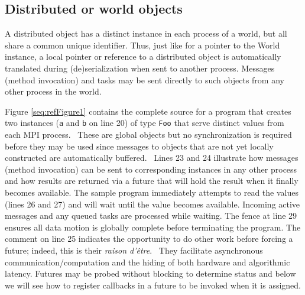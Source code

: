 \documentclass[letterpaper]{article}
\newcounter{Figure}
\begin{document}
\subsection{Distributed or world objects}
A distributed object has a distinct instance in each process of a world, but all share a common unique identifier. Thus,
just like for a pointer to the World instance, a local pointer or reference to a distributed object is automatically
translated during (de)serialization when sent to another process. Messages (method invocation) and tasks may be sent
directly to such objects from any other process in the world.

Figure \ref{seq:refFigure1} contains the complete source for a program that creates two instances (\texttt{a} and
\texttt{b} on line 20) of type \texttt{Foo} that serve distinct values from each MPI process. \ These are global
objects but no synchronization is required before they may be used since messages to objects that are not yet locally
constructed are automatically buffered. \ Lines 23 and 24 illustrate how messages (method invocation) can be sent to
corresponding instances in any other process and how results are returned via a future that will hold the result when
it finally becomes available. The sample program immediately attempts to read the values (lines 26 and 27) and will
wait until the value becomes available. Incoming active messages and any queued tasks are processed while waiting. The
fence at line 29 ensures all data motion is globally complete before terminating the program. The comment on line 25
indicates the opportunity to do other work before forcing a future; indeed, this is their \textit{raison
d'}\textit{\^e}\textit{tre}. \ They facilitate asynchronous communication/computation and the hiding of both hardware
and algorithmic latency. Futures may be probed without blocking to determine status and below we will see how to
register callbacks in a future to be invoked when it is assigned. 
\end{document}
